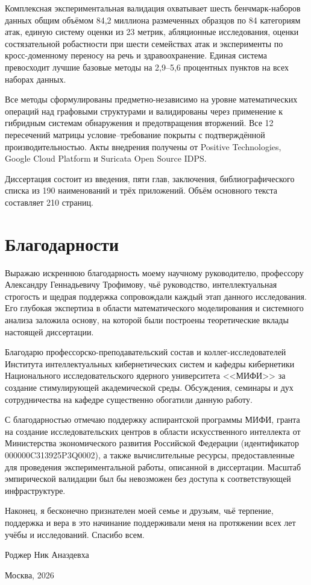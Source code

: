 Комплексная экспериментальная валидация охватывает шесть бенчмарк-наборов данных общим объёмом 84,2 миллиона размеченных образцов по 84 категориям атак, единую систему оценки из 23 метрик, абляционные исследования, оценки состязательной робастности при шести семействах атак и эксперименты по кросс-доменному переносу на речь и здравоохранение. Единая система превосходит лучшие базовые методы на 2,9--5,6 процентных пунктов на всех наборах данных.

Все методы сформулированы предметно-независимо на уровне математических операций над графовыми структурами и валидированы через применение к гибридным системам обнаружения и предотвращения вторжений. Все 12 пересечений матрицы условие--требование покрыты с подтверждённой производительностью. Акты внедрения получены от Positive Technologies, Google Cloud Platform и Suricata Open Source IDPS.

Диссертация состоит из введения, пяти глав, заключения, библиографического списка из 190 наименований и трёх приложений. Объём основного текста составляет 210 страниц.


\chapter*{Благодарности}

Выражаю искреннюю благодарность моему научному руководителю, профессору Александру Геннадьевичу Трофимову, чьё руководство, интеллектуальная строгость и щедрая поддержка сопровождали каждый этап данного исследования. Его глубокая экспертиза в области математического моделирования и системного анализа заложила основу, на которой были построены теоретические вклады настоящей диссертации.

Благодарю профессорско-преподавательский состав и коллег-исследователей Института интеллектуальных кибернетических систем и кафедры кибернетики Национального исследовательского ядерного университета <<МИФИ>> за создание стимулирующей академической среды. Обсуждения, семинары и дух сотрудничества на кафедре существенно обогатили данную работу.

С благодарностью отмечаю поддержку аспирантской программы МИФИ, гранта на создание исследовательских центров в области искусственного интеллекта от Министерства экономического развития Российской Федерации (идентификатор 000000C313925P3Q0002), а также вычислительные ресурсы, предоставленные для проведения экспериментальной работы, описанной в диссертации. Масштаб эмпирической валидации был бы невозможен без доступа к соответствующей инфраструктуре.

Наконец, я бесконечно признателен моей семье и друзьям, чьё терпение, поддержка и вера в это начинание поддерживали меня на протяжении всех лет учёбы и исследований. Спасибо всем.

\hfill Роджер Ник Анаэдевха

\hfill Москва, 2026 

